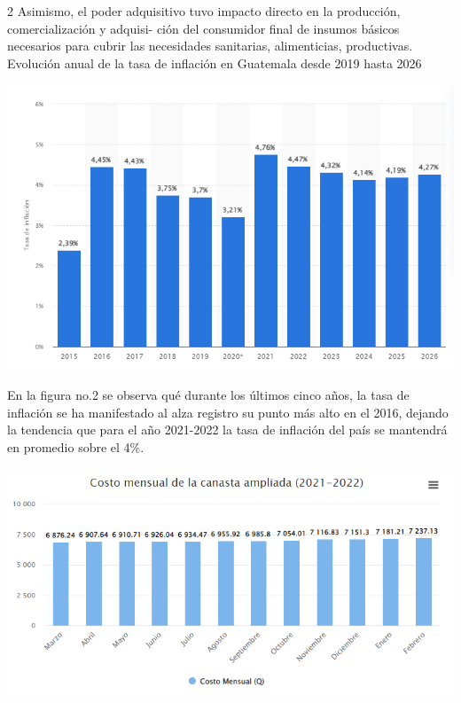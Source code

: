 \documentclass[12pt,spanish,Letterpaper,openany]{book}
\begin{document}
\begin {multicols}{2}
Asimismo, el poder adquisitivo tuvo impacto directo en la producción, comercialización y adquisi-
ción del consumidor final de insumos básicos necesarios para cubrir las necesidades sanitarias, alimenticias, productivas. Evolución anual de la tasa de inflación en Guatemala desde 2019 hasta 2026

\begin {flushleft}
\noindent\begin{minipage}[c]{\columnwidth}
\centering

\includegraphics[width=1\linewidth]{images/pareja25_image3}

\end{minipage}
\end {flushleft}

En la figura no.2 se observa qué durante los últimos cinco años, la tasa de inflación se ha manifestado al alza registro su punto más alto en el 2016, dejando la tendencia que para el año 2021-2022 la tasa de inflación del país se mantendrá en promedio sobre el 4\%.

\begin {flushleft}
\noindent\begin{minipage}[c]{\columnwidth}
\centering

\includegraphics[width=1\linewidth]{images/pareja25_image4}


\end{minipage}
\end{flushleft}
\end{multicols}
\end{document}
